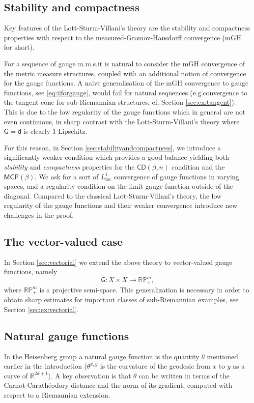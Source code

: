 \documentclass[11pt,a4paper]{article}
\theoremstyle{plain}
\theoremstyle{definition}
\theoremstyle{remark}
\numberwithin{equation}{section}
\newcommand{\R}{\mathbb{R}} %
\newcommand{\RP}{\mathbb{RP}} %
\newcommand{\CD}{\mathsf{CD}}
\newcommand{\MCP}{\mathsf{MCP}}
\newcommand{\loc}{\mathrm{loc}}
\newcommand{\sfd}{\mathsf d}
\newcommand{\sfG}{\mathsf G}
\begin{document}
\subsection*{Stability and compactness}
 Key features of the Lott-Sturm-Villani's theory are the stability and compactness properties with respect to the measured-Gromov-Hausdorff convergence (mGH for short).

For  a sequence of gauge m.m.s.\@ it is natural to consider the mGH convergence of the metric measure structures, coupled with  an additional notion of convergence for the gauge functions.
A naive generalisation of  the mGH convergence to gauge functions,  see \eqref{eq:iiforgauge}, would fail for  natural sequences  (e.g.\@ convergence to the tangent cone for sub-Riemannian structures, cf. Section \ref{sec:ex:tangent}). This is due to the low regularity of the gauge functions which in general are not even continuous, in sharp contrast with the Lott-Sturm-Villani's theory where $\sfG=\sfd$ is clearly $1$-Lipschitz. 

For this reason, in Section \ref{sec:stabilityandcompactness}, we introduce a significantly weaker condition which provides a good balance yielding both \emph{stability} and \emph{compactness} properties for the $\CD(\beta,n)$ condition and the $\MCP(\beta)$.  We ask for a sort of  $L^1_{\loc}$ convergence of gauge functions in varying spaces, and a regularity condition on the limit gauge  function outside of the diagonal. Compared to the classical Lott-Sturm-Villani's theory, the low regularity of the gauge functions and their weaker convergence introduce new challenges in the proof. 

\subsection*{The vector-valued case}
 In Section \ref{sec:vectorial} we extend the above theory to vector-valued gauge functions, namely 
\begin{equation} 
\sfG: X\times X\to \RP^{m}_{+},
\end{equation}
where  $\RP^{m}_{+}$ is a projective semi-space. This generalization is necessary in order to obtain sharp estimates for important classes of sub-Riemannian examples, see Section \ref{sec:ex:vectorial}.

\subsection*{Natural gauge functions} 
In the Heisenberg group a natural gauge function is the quantity $\theta$ mentioned earlier in the introduction ($\theta^{x,y}$ is the curvature of the geodesic from $x$ to $y$ as a curve of $\R^{2d+1}$). A key observation is that $\theta$ can be written in terms of the Carnot-Carath\'eodory distance and the norm of its gradient, computed with respect to a Riemannian extension. 
\end{document}
